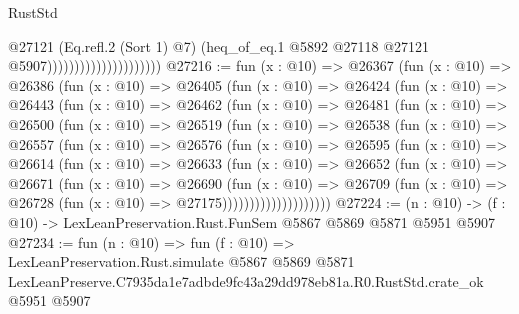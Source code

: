\begin{lexlean}{RustStd}
\begin{coremodule}
                                            @27121
                                            (Eq.refl.{2} (Sort 1) @7)
                                            (heq_of_eq.{1}
                                              @5892
                                              @27118
                                              @27121
                                              @5907)))))))))))))))))))))
@27216 := fun (x : @10) =>
  @26367
    (fun (x : @10) =>
    @26386
      (fun (x : @10) =>
      @26405
        (fun (x : @10) =>
        @26424
          (fun (x : @10) =>
          @26443
            (fun (x : @10) =>
            @26462
              (fun (x : @10) =>
              @26481
                (fun (x : @10) =>
                @26500
                  (fun (x : @10) =>
                  @26519
                    (fun (x : @10) =>
                    @26538
                      (fun (x : @10) =>
                      @26557
                        (fun (x : @10) =>
                        @26576
                          (fun (x : @10) =>
                          @26595
                            (fun (x : @10) =>
                            @26614
                              (fun (x : @10) =>
                              @26633
                                (fun (x : @10) =>
                                @26652
                                  (fun (x : @10) =>
                                  @26671
                                    (fun (x : @10) =>
                                    @26690
                                      (fun (x : @10) =>
                                      @26709
                                        (fun (x : @10) =>
                                        @26728 (fun (x : @10) => @27175))))))))))))))))))))
@27224 := (n : @10) -> (f : @10) -> LexLeanPreservation.Rust.FunSem @5867 @5869 @5871 @5951 @5907
@27234 := fun (n : @10) =>
  fun (f : @10) =>
  LexLeanPreservation.Rust.simulate
    @5867
    @5869
    @5871
    LexLeanPreserve.C7935da1e7adbde9fc43a29dd978eb81a.R0.RustStd.crate_ok
    @5951
    @5907
\end{coremodule}
\end{lexlean}
